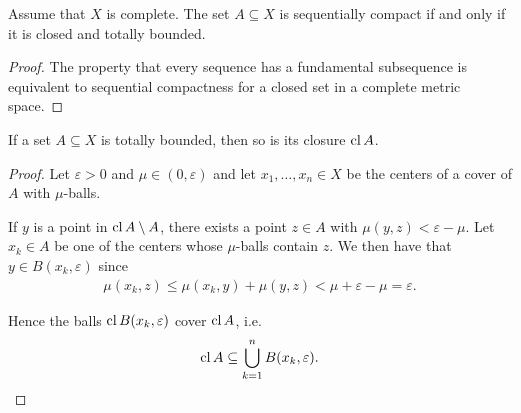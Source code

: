 \begin{corollary}\label{thm:metric_space_compact_iff_closed_totally_bounded}
  Assume that \( X \) is complete. The set \( A \subseteq X \) is sequentially compact if and only if it is closed and totally bounded.
\end{corollary}
\begin{proof}
  The property that every sequence has a fundamental subsequence is equivalent to sequential compactness for a closed set in a complete metric space.
\end{proof}

\begin{proposition}\label{thm:closure_of_totally_bounded_is_totally_bounded}
  If a set \( A \subseteq X \) is totally bounded, then so is its closure \( \operatorname{cl} A \).
\end{proposition}
\begin{proof}
  Let \( \varepsilon > 0 \) and \( \mu \in (0, \varepsilon) \) and let \( x_1, \ldots, x_n \in X \) be the centers of a cover of \( A \) with \( \mu \)-balls.

  If \( y \) is a point in \( \operatorname{cl} A \setminus A \), there exists a point \( z \in A \) with \( \mu(y, z) < \varepsilon - \mu \). Let \( x_k \in A \) be one of the centers whose \( \mu \)-balls contain \( z \). We then have that \( y \in B(x_k, \varepsilon) \) since
  \begin{align*}
    \mu(x_k, z) \leq \mu(x_k, y) + \mu(y, z) < \mu + \varepsilon - \mu = \varepsilon.
  \end{align*}

  Hence the balls \( \operatorname{cl} B(x_k, \varepsilon) \) cover \( \operatorname{cl} A \), i.e.
  \begin{align*}
    \operatorname{cl} A \subseteq \bigcup_{k=1}^n B(x_k, \varepsilon).
  \end{align*}
\end{proof}

